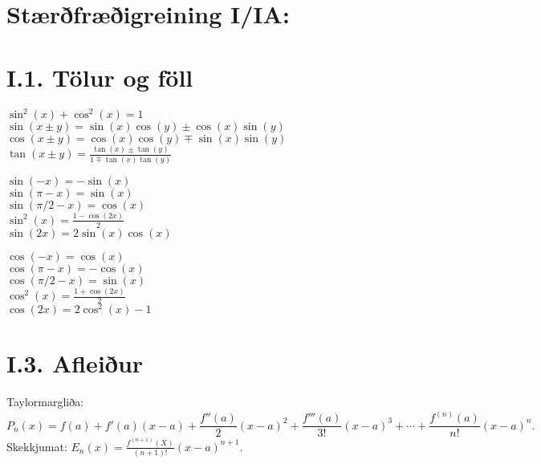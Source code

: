 \section*{ Stærðfræðigreining I/IA:}

\noindent
\section*{I.1. Tölur og föll}


\begin{minipage}{.45\linewidth}
  $\sin^2(x) + \cos^2(x) =1  $\\
  $\sin(x\pm y) = \sin(x)\cos(y)\pm \cos(x)\sin(y)$\\
  $\cos(x\pm y) = \cos(x)\cos(y)\mp \sin(x)\sin(y)$\\
  $\tan(x\pm y) = \frac{\tan(x)\pm \tan(y)}{1\mp\tan(x)\tan(y)}$
\end{minipage}%
\begin{minipage}{.30\linewidth}
  $\sin(-x) = -\sin(x)$\\
  $\sin(\pi-x)=\sin(x)$\\
  $\sin(\pi/2-x)=\cos(x)$\\
  $\sin^2(x) = \frac {1-\cos(2x)}2$\\
  $\sin(2x)=2\sin(x)\cos(x)$
\end{minipage}%
\begin{minipage}{.25\linewidth}
  $\cos(-x) = \cos(x)$\\
  $\cos(\pi-x)=-\cos(x)$\\
  $\cos(\pi/2-x) = \sin(x)$\\
  $\cos^2(x) = \frac{1+\cos(2x)}2$\\
  $\cos(2x)=2\cos^2(x)-1$
\end{minipage}


\section*{I.3. Afleiður}


Taylormargliða: 
\[
  P_n(x)=f(a)+f'(a)(x-a)+\frac{f''(a)}{2}(x-a)^2+
\frac{f'''(a)}{3!}(x-a)^3+\cdots+\frac{f^{(n)}(a)}{n!}(x-a)^n.
\]
Skekkjumat: $E_n(x) = \frac{f^{(n+1)}(X)}{(n+1)!}(x-a)^{n+1}$.

